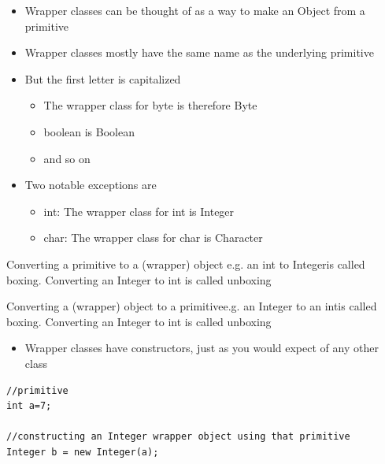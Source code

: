 \documentclass{beamer}
\begin{document}
\begin{frame}

\begin{itemize}
\item Wrapper classes can be thought of as a way to make an Object from a primitive
\item Wrapper classes mostly have the same name as the underlying primitive
\item But the first letter is capitalized
\begin{itemize}
\item The wrapper class for byte is therefore Byte
\item boolean is Boolean 
\item and so on 
\end{itemize}
\item Two notable exceptions are
\begin{itemize}
\item int: The wrapper class for int is Integer
\item char: The wrapper class for char is Character
\end{itemize}
\end{itemize}
\end{frame}

\begin{frame}
\begin{definition}[Boxing]
Converting a primitive to a (wrapper) object \newline e.g. an int to Integer\newline is called boxing.
Converting an Integer to int is called unboxing
\end{definition}
\begin{definition}[Unboxing]
Converting a (wrapper) object to a primitive\newline e.g. an Integer to an int\newline is called boxing.
Converting an Integer to int is called unboxing
\end{definition}
\end{frame}



\begin{frame}[fragile]

\begin{itemize}
\item Wrapper classes have constructors, just as you would expect of any other class
\end{itemize}

\begin{block}{}
\begin{lstlisting}
//primitive
int a=7;

//constructing an Integer wrapper object using that primitive
Integer b = new Integer(a);

\end{lstlisting}
\end{block}

\end{frame}
\end{document}
